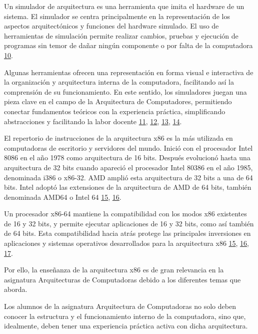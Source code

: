 \documentclass[12pt,twoside]{templates/unerthesis}
\begin{document}
Un simulador de arquitectura es una herramienta que imita el hardware de un sistema. El simulador se centra principalmente en la representación de los aspectos arquitectónicos y funciones del hardware simulado. El uso de herramientas de simulación permite realizar cambios, pruebas y ejecución de programas sin temor de dañar ningún componente o por falta de la computadora \protect\hyperlink{ref-radivojevic_design_2011}{10}.

Algunas herramientas ofrecen una representación en forma visual e interactiva de la organización y arquitectura interna de la computadora, facilitando así la comprensión de su funcionamiento. En este sentido, los simuladores juegan una pieza clave en el campo de la Arquitectura de Computadores, permitiendo conectar fundamentos teóricos con la experiencia práctica, simpliﬁcando abstracciones y facilitando la labor docente \protect\hyperlink{ref-nikolic_survey_2009}{11}, \protect\hyperlink{ref-hasan_survey_2012}{12}, \protect\hyperlink{ref-hennessy_computer_2012}{13}, \protect\hyperlink{ref-stallings_computer_2013}{14}.

El repertorio de instrucciones de la arquitectura x86 es la más utilizada en computadoras de escritorio y servidores del mundo. Inició con el procesador Intel 8086 en el año 1978 como arquitectura de 16 bits. Después evolucionó hasta una arquitectura de 32 bits cuando apareció el procesador Intel 80386 en el año 1985, denominada i386 o x86-32. AMD amplió esta arquitectura de 32 bits a una de 64 bits. Intel adoptó las extensiones de la arquitectura de AMD de 64 bits, también denominada AMD64 o Intel 64 \protect\hyperlink{ref-intel_64_2016}{15}, \protect\hyperlink{ref-amd_developer_2019}{16}.

Un procesador x86-64 mantiene la compatibilidad con los modos x86 existentes de 16 y 32 bits, y permite ejecutar aplicaciones de 16 y 32 bits, como así también de 64 bits. Esta compatibilidad hacia atrás protege las principales inversiones en aplicaciones y sistemas operativos desarrollados para la arquitectura x86 \protect\hyperlink{ref-intel_64_2016}{15}, \protect\hyperlink{ref-amd_developer_2019}{16}, \protect\hyperlink{ref-abel_ibm_2000}{17}.

Por ello, la enseñanza de la arquitectura x86 es de gran relevancia en la asignatura Arquitecturas de Computadoras debido a los diferentes temas que aborda.

Los alumnos de la asignatura Arquitectura de Computadoras no solo deben conocer la estructura y el funcionamiento interno de la computadora, sino que, idealmente, deben tener una experiencia práctica activa con dicha arquitectura.
\end{document}
